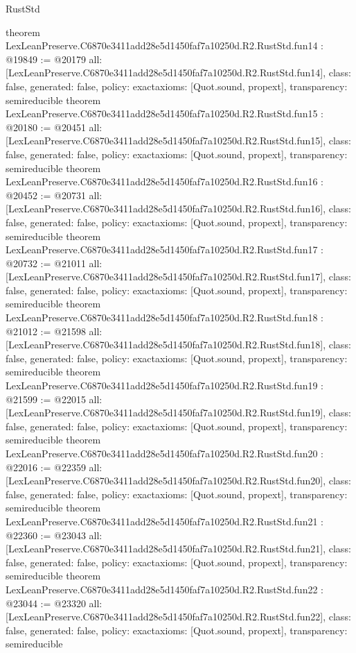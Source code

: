 \begin{lexlean}{RustStd}
\begin{coremodule}
{}
theorem LexLeanPreserve.C6870e3411add28e5d1450faf7a10250d.R2.RustStd.fun14 : @19849 := @20179 {
  all: [LexLeanPreserve.C6870e3411add28e5d1450faf7a10250d.R2.RustStd.fun14],
  class: false,
  generated: false,
  policy: exact{axioms: [Quot.sound, propext]},
  transparency: semireducible
}
theorem LexLeanPreserve.C6870e3411add28e5d1450faf7a10250d.R2.RustStd.fun15 : @20180 := @20451 {
  all: [LexLeanPreserve.C6870e3411add28e5d1450faf7a10250d.R2.RustStd.fun15],
  class: false,
  generated: false,
  policy: exact{axioms: [Quot.sound, propext]},
  transparency: semireducible
}
theorem LexLeanPreserve.C6870e3411add28e5d1450faf7a10250d.R2.RustStd.fun16 : @20452 := @20731 {
  all: [LexLeanPreserve.C6870e3411add28e5d1450faf7a10250d.R2.RustStd.fun16],
  class: false,
  generated: false,
  policy: exact{axioms: [Quot.sound, propext]},
  transparency: semireducible
}
theorem LexLeanPreserve.C6870e3411add28e5d1450faf7a10250d.R2.RustStd.fun17 : @20732 := @21011 {
  all: [LexLeanPreserve.C6870e3411add28e5d1450faf7a10250d.R2.RustStd.fun17],
  class: false,
  generated: false,
  policy: exact{axioms: [Quot.sound, propext]},
  transparency: semireducible
}
theorem LexLeanPreserve.C6870e3411add28e5d1450faf7a10250d.R2.RustStd.fun18 : @21012 := @21598 {
  all: [LexLeanPreserve.C6870e3411add28e5d1450faf7a10250d.R2.RustStd.fun18],
  class: false,
  generated: false,
  policy: exact{axioms: [Quot.sound, propext]},
  transparency: semireducible
}
theorem LexLeanPreserve.C6870e3411add28e5d1450faf7a10250d.R2.RustStd.fun19 : @21599 := @22015 {
  all: [LexLeanPreserve.C6870e3411add28e5d1450faf7a10250d.R2.RustStd.fun19],
  class: false,
  generated: false,
  policy: exact{axioms: [Quot.sound, propext]},
  transparency: semireducible
}
theorem LexLeanPreserve.C6870e3411add28e5d1450faf7a10250d.R2.RustStd.fun20 : @22016 := @22359 {
  all: [LexLeanPreserve.C6870e3411add28e5d1450faf7a10250d.R2.RustStd.fun20],
  class: false,
  generated: false,
  policy: exact{axioms: [Quot.sound, propext]},
  transparency: semireducible
}
theorem LexLeanPreserve.C6870e3411add28e5d1450faf7a10250d.R2.RustStd.fun21 : @22360 := @23043 {
  all: [LexLeanPreserve.C6870e3411add28e5d1450faf7a10250d.R2.RustStd.fun21],
  class: false,
  generated: false,
  policy: exact{axioms: [Quot.sound, propext]},
  transparency: semireducible
}
theorem LexLeanPreserve.C6870e3411add28e5d1450faf7a10250d.R2.RustStd.fun22 : @23044 := @23320 {
  all: [LexLeanPreserve.C6870e3411add28e5d1450faf7a10250d.R2.RustStd.fun22],
  class: false,
  generated: false,
  policy: exact{axioms: [Quot.sound, propext]},
  transparency: semireducible
}
\end{coremodule}
\end{lexlean}

